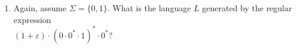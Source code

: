 \begin{enumerate}
\item Again, assume $\Sigma = \{0,1\}$.  What is the language $L$ generated by the regular expression 
      \\[0.2cm]
      \hspace*{1.3cm}
      $(1 + \varepsilon)\cdot(0\cdot 0^* \cdot 1)^* \cdot 0^*$?  \eox

\end{enumerate}
\renewcommand{\labelenumi}{\arabic{enumi}.}
\pagebreak

